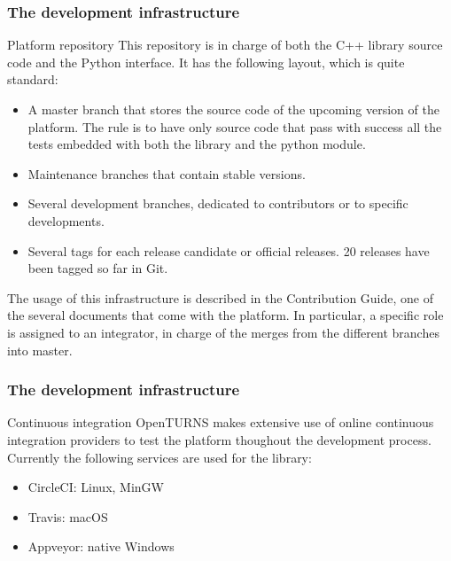 \documentclass[8pt]{beamer}
\begin{document}
\begin{frame}
  \frametitle{The development infrastructure}
  \begin{block}{Platform repository}
    This repository is in charge of both the C++ library source code and the Python interface. It has the following layout, which is quite standard:
    \begin{itemize}
    \item A master branch that stores the source code of the upcoming version of the platform. The rule is to have only source code that pass with success all the tests embedded with both the library and the python module.
    \item Maintenance branches that contain stable versions.
    \item Several development branches, dedicated to contributors or to specific developments.
    \item Several tags for each release candidate or official releases. 20 releases have been tagged so far in Git.
    \end{itemize}
    The usage of this infrastructure is described in the Contribution Guide, one of the several documents that come with the platform. In particular, a specific role is assigned to an \alert{integrator}, in charge of the merges from the different branches into master.
  \end{block}
\end{frame}
\begin{frame}
  \frametitle{The development infrastructure}
  \begin{block}{Continuous integration}
    OpenTURNS makes extensive use of online continuous integration providers to test the platform thoughout the development process. Currently the following services are used for the library:
    \begin{itemize}
    \item CircleCI: Linux, MinGW
    \item Travis: macOS
    \item Appveyor: native Windows
    \end{itemize}
  \end{block}
\end{frame}
\end{document}
